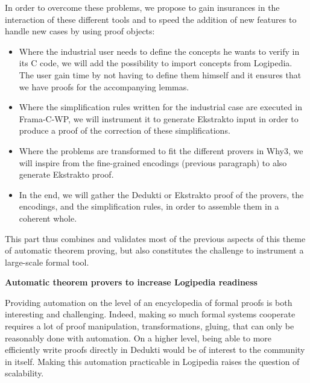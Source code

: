 In order to overcome these problems, we propose to gain insurances in
the interaction of these different tools and to speed the addition of
new features to handle new cases by using proof objects:
\begin{itemize}
\item Where the industrial user needs to define the concepts he wants to
  verify in its C code, we will add the possibility to import concepts
  from Logipedia. The user gain time by not having to define them
  himself and it ensures that we have proofs for the accompanying
  lemmas.
\item Where the simplification rules written for the industrial case are
  executed in Frama-C-WP, we will instrument it to generate Ekstrakto
  input in order to produce a proof of the correction of these
  simplifications.
\item Where the problems are transformed to fit the different provers in
  Why3, we will inspire from the fine-grained encodings (previous
  paragraph) to also generate Ekstrakto proof.
\item In the end, we will gather the Dedukti or Ekstrakto proof of the
  provers, the encodings, and the simplification rules, in order to
  assemble them in a coherent whole.
\end{itemize}
This part thus combines and validates most of the previous aspects of
this theme of automatic theorem proving, but also constitutes the
challenge to instrument a large-scale formal tool.

\medskip

\noindent
{\bf \large Automatic theorem provers to increase Logipedia readiness}

Providing automation on the level of an encyclopedia of formal proofs is
both interesting and challenging. Indeed, making so much formal systems
cooperate requires a lot of proof manipulation, transformations, gluing,
that can only be reasonably done with automation. On a higher level,
being able to more efficiently write proofs directly in Dedukti would be
of interest to the community in itself. Making this automation
practicable in Logipedia raises the question of scalability.


